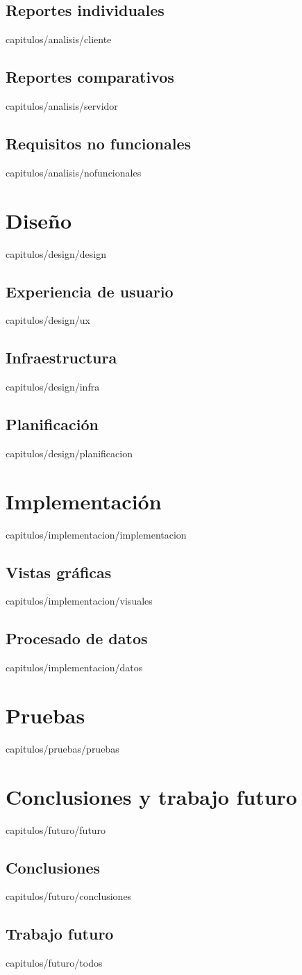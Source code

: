 \documentclass[epsbased,copyright,final,printable,covers,extendedindex,firstnumbered,tfg,gnuplot]{thesis}
\begin{document}
  \section{Reportes individuales\label{SEC:CLIENTE}}{capitulos/analisis/cliente}
  \section{Reportes comparativos\label{SEC:SERVIDOR}}{capitulos/analisis/servidor}
  \section{Requisitos no funcionales\label{SEC:NOFUNCIONALES}}{capitulos/analisis/nofuncionales}

\chapter{Diseño\label{CAP:DESIGN}}{capitulos/design/design}
  \section{Experiencia de usuario\label{SEC:UX}}{capitulos/design/ux}
  \section{Infraestructura\label{SEC:INFRA}}{capitulos/design/infra}
  \section{Planificación\label{SEC:PLANIFICACION}}{capitulos/design/planificacion}

\chapter{Implementación\label{CAP:IMPLEMENTACION}}{capitulos/implementacion/implementacion}
  \section{Vistas gráficas\label{SEC:VISUALES}}{capitulos/implementacion/visuales}
  \section{Procesado de datos\label{SEC:DATOS}}{capitulos/implementacion/datos}

\chapter{Pruebas\label{CAP:PRUEBAS}}{capitulos/pruebas/pruebas}

\chapter{Conclusiones y trabajo futuro\label{CAP:FUTURO}}{capitulos/futuro/futuro}
  \section{Conclusiones\label{SEC:CONCLUSIONES}}{capitulos/futuro/conclusiones}
  \section{Trabajo futuro\label{SEC:TODOS}}{capitulos/futuro/todos}
\end{document}
